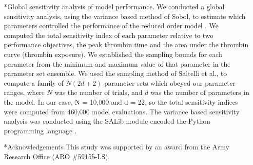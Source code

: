 \documentclass[12pt]{article}
\makeatletter
\renewcommand\subsection{\@startsection
	{subsection}{2}{0mm}
	{-0.05in}
	{-0.5\baselineskip}
	{\normalfont\normalsize\bfseries}}
\renewcommand\section{\@startsection
	{subsection}{2}{0mm}
	{-0.2in}
	{0.05\baselineskip}
	{\normalfont\large\bfseries}}
\makeatother
\begin{document}
\subsection*{Global sensitivity analysis of model performance.}
We conducted a global sensitivity analysis, using the variance based method of Sobol, to estimate which parameters controlled the performance of the reduced order model \citep{SOBOL_METHOD}. 
We computed the total sensitivity index of each parameter relative to two performance objectives, the peak thrombin time and the area under the thrombin curve (thrombin exposure).
We established the sampling bounds for each parameter from the minimum and maximum value of that parameter in the parameter set ensemble. 
We used the sampling method of Saltelli et al., \citep{Saltelli:2010} to compute a family of $N\left(2d+2\right)$ parameter sets which obeyed our parameter ranges, 
where $N$ was the number of trials, and $d$ was the number of parameters in the model. In our case, N = 10,000 and d = 22, so the total sensitivity indices were computed from
460,000 model evaluations. The variance based sensitivity analysis was conducted using the SALib module encoded the Python programming language \citep{SALIB}.

\section*{Acknowledgements}
This study was supported by an award from the Army Research Office (ARO \#59155-LS).

\clearpage
%
%




\clearpage
\end{document}
